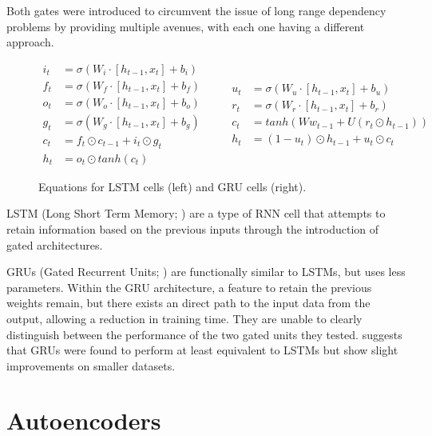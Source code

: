 \documentclass[12pt,twoside]{report}
\begin{document}
Both gates were introduced to circumvent the issue of long range dependency problems by providing multiple avenues, with each one having a different approach.

\begin{figure}[!ht]
\begin{equation}
  \begin{split}
    i_t &= \sigma(W_i \cdot [h_{t-1},x_t] + b_i) \\
    f_t &= \sigma(W_f \cdot [h_{t-1},x_t] + b_f) \\
		o_t &= \sigma(W_o \cdot [h_{t-1},x_t] + b_o) \\
		g_t &= \sigma(W_g \cdot [h_{t-1},x_t] + b_g) \\
		c_t &= f_t \odot c_{t-1} + i_t \odot g_t \\
		h_t &= o_t \odot tanh(c_t) 
  \end{split}
	\quad\quad
  \begin{split}
		u_t &= \sigma(W_u \cdot [h_{t-1},x_t] + b_u) \\
		r_t &= \sigma(W_r \cdot [h_{t-1},x_t] + b_r) \\
		c_t &= tanh(Ww_{t-1}+U(r_t \odot h_{t-1})) \\
		h_t &= (1-u_{t})\odot h_{t-1} + u_t \odot c_t
  \end{split}
\end{equation}
\caption{Equations for LSTM cells (left) and GRU cells (right).}
\end{figure}
 
LSTM (Long Short Term Memory; \cite{hochreiter_long_1997}) are a type of RNN cell that attempts to retain information based on the previous inputs through the introduction of gated architectures. 

GRUs (Gated Recurrent Units; \cite{cho_properties_2014}) are functionally similar to LSTMs, but uses less parameters. Within the GRU architecture, a feature to retain the previous weights remain, but there exists an direct path to the input data from the output, allowing a reduction in training time. They are unable to clearly distinguish between the performance of the two gated units they tested. \cite{chung_empirical_2014} suggests that GRUs were found to perform at least equivalent to LSTMs but show slight improvements on smaller datasets. 

\section{Autoencoders}
\end{document}
